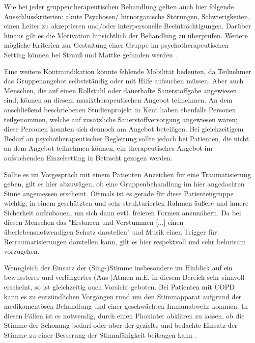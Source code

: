 Wie bei jeder gruppentherapeutischen Behandlung gelten auch hier folgende Ausschlusskriterien: akute Psychosen/ hirnorganische Störungen, Schwierigkeiten, einen Leiter zu akzeptieren und/oder interpersonelle Beeinträchtigungen. Darüber hinaus gilt es die Motivation hinsichtlich der Behandlung zu überprüfen. Weitere mögliche Kriterien zur Gestaltung einer Gruppe im psychotherapeutischen Setting können bei Strauß und Mattke gefunden werden \autocite[vgl.][78-88]{mattke2007}.

Eine weitere Kontraindikation könnte fehlende Mobilität bedeuten, da Teilnehmer das Gruppenangebot selbstständig oder mit Hilfe aufsuchen müssen. Aber auch Menschen, die auf einen Rollstuhl oder dauerhafte Sauerstoffgabe angewiesen sind, können an diesem musiktherapeutischen Angebot teilnehmen. An dem anschließend beschriebenen Studienprojekt in Kent haben ebenfalls Personen teilgenommen, welche auf zusätzliche Sauerstoffversorgung angewiesen waren; diese Personen konnten sich dennoch am Angebot beteiligen. Bei gleichzeitigem Bedarf an psychotherapeutischer Begleitung sollte jedoch bei Patienten, die nicht an dem Angebot teilnehmen können, ein therapeutisches Angebot im aufsuchenden Einzelsetting in Betracht gezogen werden.

Sollte es im Vorgespräch mit einem Patienten Anzeichen für eine Traumatisierung geben, gilt es hier abzuwägen, ob eine Gruppenbehandlung im hier angedachten Sinne angemessen erscheint. Oftmals ist es gerade für diese Patientengruppe wichtig, in einem geschützten und sehr strukturierten Rahmen äußere und innere Sicherheit aufzubauen, um sich dann evtl. freieren Formen anzunähern. Da bei diesen Menschen das "Erstarren und Verstummen [...] einen überlebensnotwendigen Schutz darstellen" \autocite[68]{rittner2012} und Musik einen Trigger für Retraumatisierungen darstellen kann, gilt es hier respektvoll und sehr behutsam vorzugehen.

Wenngleich der Einsatz der (Sing-)Stimme insbesondere im Hinblick auf ein bewussteres und verlängertes (Aus-)Atmen m.E. in diesem Bereich sehr sinnvoll erscheint, so ist gleichzeitig auch Vorsicht geboten. Bei Patienten mit COPD kann es zu entzündlichen Vorgängen rund um den Stimmapparat aufgrund der medikamentösen Behandlung und einer geschwächten Immunabwehr kommen. In diesen Fällen ist es notwendig, durch einen Phoniater abklären zu lassen, ob die Stimme der Schonung bedarf oder aber der gezielte und bedachte Einsatz der Stimme zu einer Besserung der Stimmfähigkeit beitragen kann \autocite[vgl.][103ff.]{alavi2009}.

